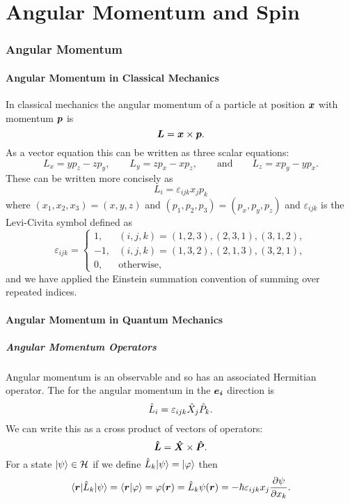 \part{Angular Momentum and Spin}
\section{Angular Momentum}
\subsection{Angular Momentum in Classical Mechanics}
In classical mechanics the angular momentum of a particle at position \(\bm{x}\) with momentum \(\bm{p}\) is
\[\bm{L} = \bm{x} \times \bm{p}.\]
As a vector equation this can be written as three scalar equations:
\[L_x = yp_z - zp_y, \qquad L_y = zp_x - xp_z,\qquad\text{and}\qquad L_z = xp_y - yp_x.\]
These can be written more concisely as
\[L_i = \varepsilon_{ijk}x_jp_k\]
where \((x_1, x_2, x_3) = (x, y, z)\) and \((p_1, p_2, p_3) = (p_x, p_y, p_z)\) and \(\varepsilon_{ijk}\) is the Levi-Civita symbol defined as
\[
\varepsilon_{ijk} = 
\begin{cases}
    1, & (i,j,k) = (1, 2, 3), (2, 3, 1), (3, 1, 2),\\
    -1, & (i, j, k) = (1, 3, 2), (2, 1, 3), (3, 2, 1),\\
    0, & \text{otherwise},
\end{cases}
\]
and we have applied the Einstein summation convention of summing over repeated indices.

\subsection{Angular Momentum in Quantum Mechanics}
\subsubsection{Angular Momentum Operators}
Angular momentum is an observable and so has an associated Hermitian operator.
The  for the angular momentum in the \(\bm{e_{i}}\) direction is
\[\hat{L}_i = \varepsilon_{ijk}\hat{X}_j\hat{P}_k.\]
We can write this as a cross product of vectors of operators:
\[\bm{\hat{L}} = \bm{\hat{X}}\times\bm{\hat{P}}.\]
For a state \(\vert {\psi} \rangle\in\mathcal{H}\) if we define \(\hat{L}_k\vert {\psi} \rangle = \vert {\varphi} \rangle\) then
\[\langle {\bm{r}} \vert\hat{L}_k\vert {\psi} \rangle = \langle {\bm{r}} \vert {\varphi} \rangle = \varphi(\bm{r}) = \hat{L}_k\psi(\bm{r}) = -\hbar\varepsilon_{ijk}x_j\pdv{\psi}{x_k}.\]

